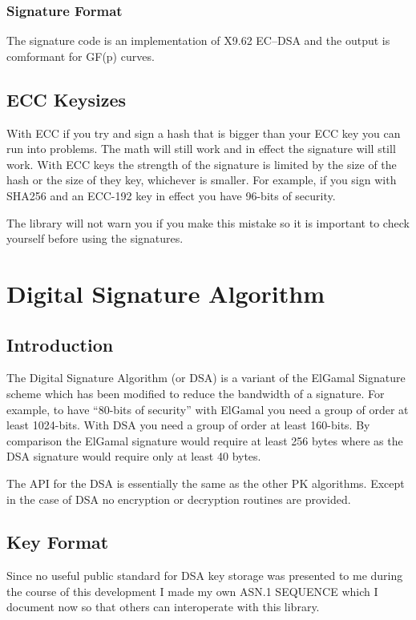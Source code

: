 \documentclass[a4paper]{book}
\begin{document}
\subsection{Signature Format}
The signature code is an implementation of X9.62 EC--DSA and the output is comformant for GF(p) curves.

\section{ECC Keysizes}
With ECC if you try and sign a hash that is bigger than your ECC key you can run into problems.  The math will still work
and in effect the signature will still work.  With ECC keys the strength of the signature is limited by the size of
the hash or the size of they key, whichever is smaller.  For example, if you sign with SHA256 and an ECC-192 key in effect
you have 96-bits of security.  

The library will not warn you if you make this mistake so it is important to check yourself before using the 
signatures.

\chapter{Digital Signature Algorithm}
\section{Introduction}
The Digital Signature Algorithm (or DSA) is a variant of the ElGamal Signature scheme which has been modified to 
reduce the bandwidth of a signature.  For example, to have ``80-bits of security'' with ElGamal you need a group of 
order at least 1024-bits.  With DSA you need a group of order at least 160-bits.  By comparison the ElGamal signature
would require at least 256 bytes where as the DSA signature would require only at least 40 bytes.  

The API for the DSA is essentially the same as the other PK algorithms.  Except in the case of DSA no encryption or
decryption routines are provided.  

\section{Key Format}
Since no useful public standard for DSA key storage was presented to me during the course of this development I made my own ASN.1 SEQUENCE which I document
now so that others can interoperate with this library.
\end{document}
